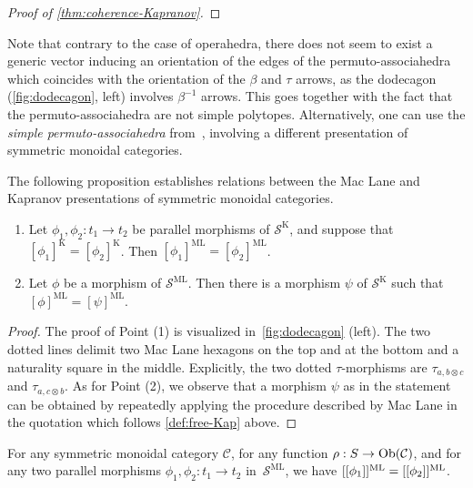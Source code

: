 {\begin{proof}[Proof of \cref{thm:coherence-Kapranov}]
\end{proof}
\begin{rem}
    Note that contrary to the case of operahedra, there does not seem to exist a generic vector inducing an orientation of the edges of the permuto-associahedra which coincides with the orientation of the $\beta$ and $\tau$ arrows, as the dodecagon (\cref{fig:dodecagon}, left) involves $\beta^{-1}$ arrows. 
    This goes together with the fact that the permuto-associahedra are not simple polytopes.
    Alternatively, one can use the \emph{simple permuto-associahedra} from~\cite{baralicSimplePermutoassociahedron2019}, involving a different presentation of symmetric monoidal categories.
\end{rem}
The following proposition establishes relations between the Mac Lane and Kapranov presentations of symmetric monoidal categories.
\begin{proposition}
\label{Kapranov-MacLane}
\leavevmode
\begin{enumerate}
\item Let $\phi_1,\phi_2: t_1 \to t_2$  be parallel morphisms of $\mathcal{S}^{\mathrm{K}}$, and suppose that $[\phi_1]^{\mathrm{K}}=[\phi_2]^{\mathrm{K}}$. Then $[\phi_1]^{\mathrm{ML}}=[\phi_2]^{\mathrm{ML}}$.
\item Let $\phi$ be a morphism of $\mathcal{S}^{\mathrm{ML}}$. Then there is a morphism $\psi$ of 
$\mathcal{S}^{\mathrm{K}}$ such that $[\phi]^{\mathrm{ML}}=[\psi]^{\mathrm{ML}}$.
\end{enumerate}
\end{proposition}
\begin{proof}
The proof of Point (1) is visualized in~\cref{fig:dodecagon} (left).  
The two dotted lines delimit two Mac Lane hexagons on the top and at the bottom and a naturality square in the middle.
Explicitly, the two dotted $\tau$-morphisms are $\tau_{a,b\otimes c}$ and $\tau_{a,c\otimes b}$.  
As for Point (2), we observe that a morphism $\psi$ as in the statement can be obtained by repeatedly applying the procedure described by Mac Lane in the quotation which follows \cref{def:free-Kap} above.
\end{proof}
\begin{thm}
\label{thm:coherence-MacLane}
    For any symmetric monoidal category $\mathcal{C}$, for any  function $\rho : S \to \mathrm{Ob}(\mathcal{C})$, and for any two parallel morphisms $\phi_1,\phi_2: t_1 \to t_2$ in~$\mathcal{S}^{\mathrm{ML}}$, we have $[[\phi_1]]^{\mathrm{ML}}=[[\phi_2]]^{\mathrm{ML}}$.

\end{thm}}
